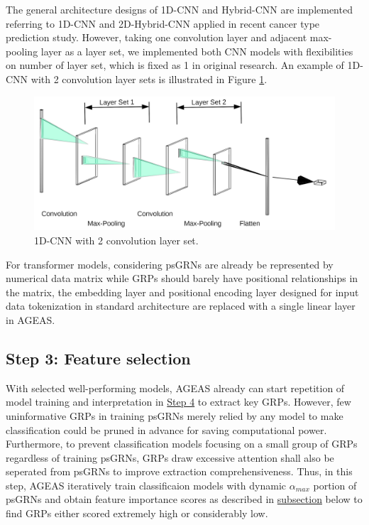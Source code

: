\documentclass[fleqn,10pt]{wlscirep}
\begin{document}
    The general architecture designs of 1D-CNN and Hybrid-CNN are implemented referring to 1D-CNN and 2D-Hybrid-CNN applied in recent cancer type prediction study.\cite{mostavi_chiu_huang_chen_2020}
    However, taking one convolution layer and adjacent max-pooling layer as a layer set, we implemented both CNN models with flexibilities on number of layer set, which is fixed as 1 in original research.
    An example of 1D-CNN with 2 convolution layer sets is illustrated in Figure \ref{1dCNN}.

    \begin{figure}[ht]
      \centering
      \includegraphics[width=0.8\linewidth]{../images/nn.png}
      \caption{1D-CNN with 2 convolution layer set.}
      \label{1dCNN}
    \end{figure}

    For transformer models, considering psGRNs are already be represented by numerical data matrix while GRPs should barely have positional relationships in the matrix, the embedding layer and positional encoding layer designed for input data tokenization in standard architecture \cite{transformer} are replaced with a single linear layer in AGEAS.

  \subsection*{Step 3: Feature selection}
    \label{step3}
    With selected well-performing models, AGEAS already can start repetition of model training and interpretation in \hyperref[step4]{Step 4} to extract key GRPs.
    However, few uninformative GRPs in training psGRNs merely relied by any model to make classification could be pruned in advance for saving computational power.
    Furthermore, to prevent classification models focusing on a small group of GRPs regardless of training psGRNs, GRPs draw excessive attention shall also be seperated from psGRNs to improve extraction comprehensiveness.
    Thus, in this step, AGEAS iteratively train classificaion models with dynamic $\alpha_{max}$ portion of psGRNs and obtain feature importance scores as described in \hyperref[features_importances]{subsection} below to find GRPs either scored extremely high or considerably low.
\end{document}
